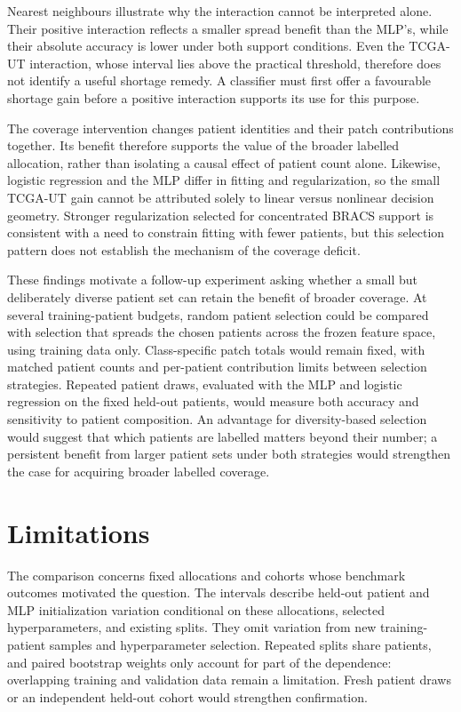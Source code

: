 \documentclass[11pt]{article}
\begin{document}
Nearest neighbours illustrate why the interaction cannot be interpreted alone. Their positive interaction reflects a smaller spread benefit than the MLP's, while their absolute accuracy is lower under both support conditions. Even the TCGA-UT interaction, whose interval lies above the practical threshold, therefore does not identify a useful shortage remedy. A classifier must first offer a favourable shortage gain before a positive interaction supports its use for this purpose.

The coverage intervention changes patient identities and their patch contributions together. Its benefit therefore supports the value of the broader labelled allocation, rather than isolating a causal effect of patient count alone. Likewise, logistic regression and the MLP differ in fitting and regularization, so the small TCGA-UT gain cannot be attributed solely to linear versus nonlinear decision geometry. Stronger regularization selected for concentrated BRACS support is consistent with a need to constrain fitting with fewer patients, but this selection pattern does not establish the mechanism of the coverage deficit.

These findings motivate a follow-up experiment asking whether a small but deliberately diverse patient set can retain the benefit of broader coverage. At several training-patient budgets, random patient selection could be compared with selection that spreads the chosen patients across the frozen feature space, using training data only. Class-specific patch totals would remain fixed, with matched patient counts and per-patient contribution limits between selection strategies. Repeated patient draws, evaluated with the MLP and logistic regression on the fixed held-out patients, would measure both accuracy and sensitivity to patient composition. An advantage for diversity-based selection would suggest that which patients are labelled matters beyond their number; a persistent benefit from larger patient sets under both strategies would strengthen the case for acquiring broader labelled coverage.

\section{Limitations}
\label{sec:budget}
The comparison concerns fixed allocations and cohorts whose benchmark outcomes motivated the question. The intervals describe held-out patient and MLP initialization variation conditional on these allocations, selected hyperparameters, and existing splits. They omit variation from new training-patient samples and hyperparameter selection. Repeated splits share patients, and paired bootstrap weights only account for part of the dependence: overlapping training and validation data remain a limitation. Fresh patient draws or an independent held-out cohort would strengthen confirmation.
\end{document}

